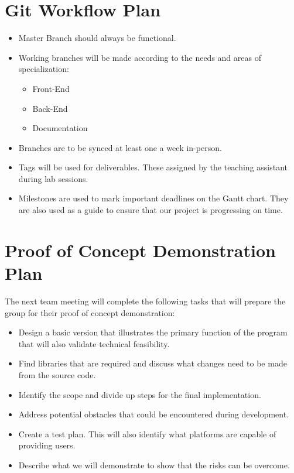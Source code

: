 \documentclass{article}
\begin{document}
\section{Git Workflow Plan}
\begin{itemize}
\item Master Branch should always be functional.
\item Working branches will be made according to the needs and areas of specialization:
\begin{itemize}
\item Front-End
\item Back-End
\item Documentation
\end{itemize}

\item Branches are to be synced at least one a week in-person. 
\item Tags will be used for deliverables. These assigned by the teaching assistant during lab sessions.

\item Milestones are used to mark important deadlines on the Gantt chart. They are also used as a guide to ensure that our project is progressing on time.

\end{itemize}

\section{Proof of Concept Demonstration Plan}

The next team meeting will complete the following tasks that will prepare the group for their proof of concept demonstration:

\begin{itemize}
\item Design a basic version that illustrates the primary function of the program that will also validate technical feasibility.
\item Find libraries that are required and discuss what changes need to be made from the source code.
\item Identify the scope and divide up steps for the final implementation.
\item Address potential obstacles that could be encountered during development.
\item Create a test plan. This will also identify what platforms are capable of providing users.

\item Describe what we will demonstrate to show that the risks can
be overcome.
\end{itemize}
\end{document}

